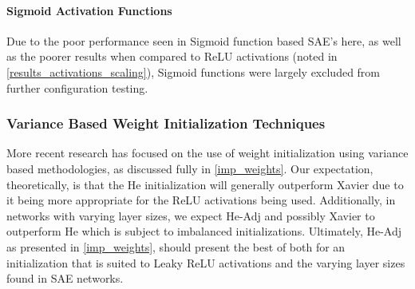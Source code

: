 \documentclass[a4paper,11pt,oneside]{article}
\theoremstyle{plain}
\theoremstyle{definition}
\begin{document}
	\paragraph{Sigmoid Activation Functions} 
	Due to the poor performance seen in Sigmoid function based SAE's here, as well as the poorer results when compared to ReLU activations (noted in \ref{results_activations_scaling}), Sigmoid functions were largely excluded from further configuration testing.
	
	
	\subsubsection{Variance Based Weight Initialization Techniques}
	
	More recent research has focused on the use of weight initialization using variance based methodologies, as discussed fully in \ref{imp_weights}. Our expectation, theoretically, is that the He initialization will generally outperform Xavier due to it being more appropriate for the ReLU activations being used. Additionally, in networks with varying layer sizes, we expect He-Adj and possibly Xavier to outperform He which is subject to imbalanced initializations. Ultimately, He-Adj as presented in \ref{imp_weights}, should present the best of both for an initialization that is suited to Leaky ReLU activations and the varying layer sizes found in SAE networks.\newline
	
\end{document}
